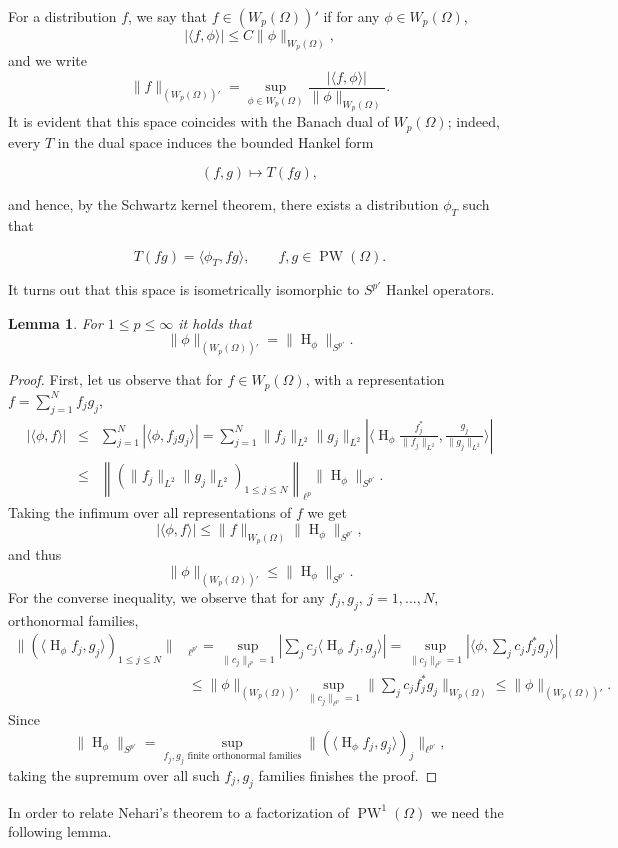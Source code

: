 \documentclass{amsart}
\theoremstyle{plain}
\newtheorem{lm}[theo]{Lemma}
\DeclareMathOperator{\Ha}{H}
\DeclareMathOperator{\PW}{PW}
\begin{document}
For a distribution $f$, we say that $f\in (W_p(\Omega))'$ if for any $\phi\in W_p(\Omega)$, 
$$|\langle f,\phi\rangle|\leq C\|\phi\|_{W_p(\Omega)},$$ and we write
$$\|f\|_{(W_p(\Omega))'}=\sup_{\phi\in W_p(\Omega)}\dfrac{|\langle f,\phi\rangle|}{\|\phi\|_{W_p(\Omega)}}.$$ It is evident that this space coincides with the Banach dual of $W_p(\Omega)$; indeed, every $T$ in the dual space induces the bounded Hankel form

$$
(f,g)\longmapsto T(fg),
$$

and hence, by the Schwartz kernel theorem, there exists a distribution $\phi_T$ such that

$$
T(fg)=\langle \phi_T,fg\rangle,\qquad f,g\in\PW(\Omega).
$$


It turns out that this space is isometrically isomorphic to $S^{p'}$ Hankel operators.
\begin{lm}\label{dualSp}
	For $1\leq p\leq \infty$ it holds that
	$$\|\phi\|_{(W_{p}(\Omega))'}=\|\Ha_\phi\|_{S^{p'}}.$$
\end{lm}
\begin{proof}
	First, let us observe that for $f\in W_{p}(\Omega)$, with a representation $f=\sum_{j=1}^N f_jg_j$,
	\begin{eqnarray}
		|\langle \phi, f\rangle|&\leq& \sum_{j=1}^N|\langle \phi, f_j g_j\rangle|=\sum_{j=1}^N\|f_j\|_{L^2}\|g_j\|_{L^2}|\langle \Ha_\phi \frac{f_j^{\ast}}{\|f_j\|_{L^2}},  \frac{g_j}{\|g_j\|_{L^2}}\rangle| \nonumber \\
		&\leq& \left\| (\|f_j\|_{L^2}\|g_j\|_{L^2})_{1\leq j\leq N}\right\|_{\ell^{p}}\|\Ha_\phi\|_{S^{p'}}.\nonumber
	\end{eqnarray}
	Taking the infimum over all representations of $f$ we get
	$$|\langle \phi, f\rangle|\leq  \|f\|_{W_{p}(\Omega)}\|\Ha_\phi\|_{S^{p'}},$$  and thus
	$$\|\phi\|_{(W_{p}(\Omega))'}\leq \|\Ha_\phi\|_{S^{p'}}.$$
	For the converse inequality, we observe that for any $f_j,g_j$, $j=1,...,N$, orthonormal families,
	\begin{align*}
		\| (\langle \Ha_\phi f_j,g_j\rangle)_{1\leq j\leq N}\|&_{\ell^{p'}}
		= \sup_{\|c_j\|_{\ell^{p}}= 1}|\sum_jc_j\langle \Ha_\phi f_j,g_j\rangle| =   \sup_{\|c_j\|_{\ell^{p}}= 1}|\langle \phi, \sum_jc_j f_j^\ast g_j\rangle| \nonumber \\
		&\leq \|\phi\|_{(W_{p}(\Omega))'} \sup_{\|c_j\|_{\ell^{p}}= 1}\|\sum_jc_j f_j^\ast g_j\|_{W_{p}(\Omega)} \leq   \|\phi\|_{(W_{p}(\Omega))'} .\nonumber
	\end{align*}
	Since
	$$\|\Ha_\phi\|_{S^{p'}}=\sup_{f_j,g_j\text{ finite orthonormal families}}	\|(\langle \Ha_\phi f_j,g_j\rangle)_{j}\|_{\ell^{p'}},$$
	taking the supremum over all such $f_j,g_j$ families finishes the proof.
\end{proof}
In order to relate Nehari's theorem to a factorization of $\PW^1(\Omega)$ we need the following lemma.
\end{document}
